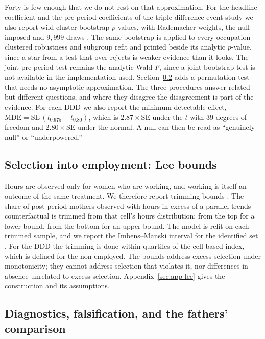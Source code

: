 \documentclass[12pt,a4paper]{article}
\begin{document}
\noindent Forty is few enough that we do not rest on that approximation. For the headline coefficient
and the pre-period coefficients of the triple-difference event study we also report wild cluster
bootstrap $p$-values, with Rademacher weights, the null imposed and $9{,}999$ draws
\citep{roodman2019, fischer2021}. The same bootstrap is applied to every occupation-clustered
robustness and subgroup refit and printed beside its analytic $p$-value, since a star from a test
that over-rejects is weaker evidence than it looks. The joint pre-period test remains the analytic
Wald $F$, since a joint bootstrap test is not available in the implementation used.
Section~\ref{sec:diagnostics} adds a permutation test that needs no asymptotic approximation.
The three procedures answer related but different questions, and where they disagree the
disagreement is part of the evidence. For each DDD we also report the minimum detectable effect,
$\mathrm{MDE} = \mathrm{SE}\,(t_{0.975} + t_{0.80})$, which is $2.87 \times \mathrm{SE}$ under
the $t$ with 39 degrees of freedom and $2.80 \times \mathrm{SE}$ under the normal. A null can
then be read as ``genuinely null'' or ``underpowered.''

\subsection{Selection into employment: Lee bounds}\label{sec:lee}

Hours are observed only for women who are working, and working is itself an outcome of the
same treatment. We therefore report trimming bounds \citep{lee2009}. The share of post-period
mothers observed with hours in excess of a parallel-trends counterfactual is trimmed from that
cell's hours distribution: from the top for a lower bound, from the bottom for an upper bound.
The model is refit on each trimmed sample, and we report the Imbens--Manski interval for the
identified set \citep{imbens2004}. For the DDD the trimming is done within quartiles of the
cell-based index, which is defined for the non-employed. The bounds address excess selection
under monotonicity; they cannot address selection that violates it, nor differences in absence
unrelated to excess selection. Appendix~\ref{sec:app-lee} gives the construction and its
assumptions.

\subsection{Diagnostics, falsification, and the fathers' comparison}\label{sec:diagnostics}
\end{document}
